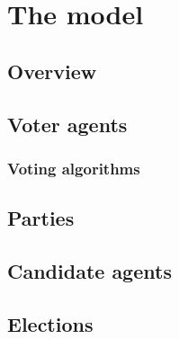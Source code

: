 \section{The model}
\label{sec:model}

\subsection{Overview}


\subsection{Voter agents}

\subsubsection{Voting algorithms}


\subsection{Parties}


\subsection{Candidate agents}


\subsection{Elections}

